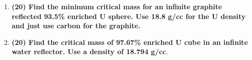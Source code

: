 \documentclass[11pt,a4paper]{article}
\begin{document}
\begin{enumerate}[leftmargin=*,topsep=0pt,font=\bfseries]
        \newpage 
    \item\textbf{(20) Find the minimum critical mass for an infinite graphite reflected 93.5\% enriched U sphere. Use 18.8 g/cc for the U density and just use carbon for the graphite.}
        \vspace{0.25in}\\





























        \newpage 
    \item\textbf{(20) Find the critical mass of 97.67\% enriched U cube in an infinite water reflector. Use a density of 18.794 g/cc}.
        \vspace{0.25in}\\






















\end{enumerate}

\newpage


\newpage


\newpage


\setlength{\bibhang}{0pt}

\end{document}
